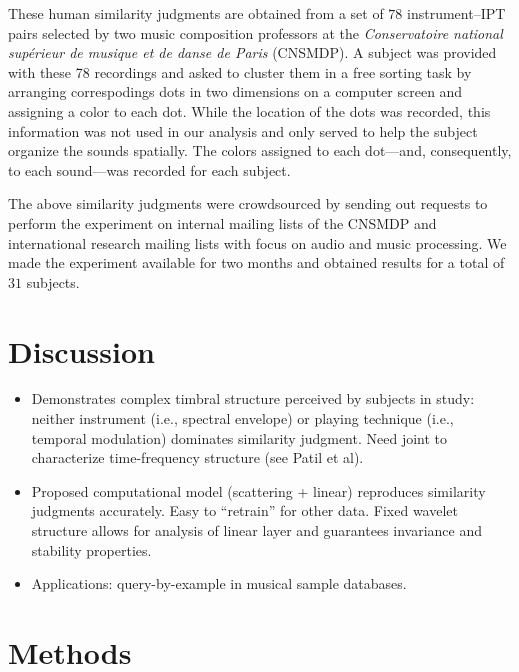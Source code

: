 \documentclass{article}
\begin{document}
These human similarity judgments are obtained from a set of $78$ instrument--IPT pairs selected by two music composition professors at the \emph{Conservatoire national sup\'erieur de musique et de danse de Paris} (CNSMDP).
A subject was provided with these 78 recordings and asked to cluster them in a free sorting task by arranging correspodings dots in two dimensions on a computer screen and assigning a color to each dot.
While the location of the dots was recorded, this information was not used in our analysis and only served to help the subject organize the sounds spatially.
The colors assigned to each dot---and, consequently, to each sound---was recorded for each subject.

The above similarity judgments were crowdsourced by sending out requests to perform the experiment on internal mailing lists of the CNSMDP and international research mailing lists with focus on audio and music processing.
We made the experiment available for two months and obtained results for a total of $31$ subjects.


\section{Discussion}
\label{sec:discussion}

\begin{itemize}
\item Demonstrates complex timbral structure perceived by subjects in study: neither instrument (i.e., spectral envelope) or playing technique (i.e., temporal modulation) dominates similarity judgment. Need joint to characterize time-frequency structure (see Patil et al).
\item Proposed computational model (scattering + linear) reproduces similarity judgments accurately. Easy to ``retrain'' for other data. Fixed wavelet structure allows for analysis of linear layer and guarantees invariance and stability properties.
\item Applications: query-by-example in musical sample databases.
\end{itemize}

\section{Methods}
\label{sec:methods}
\end{document}
